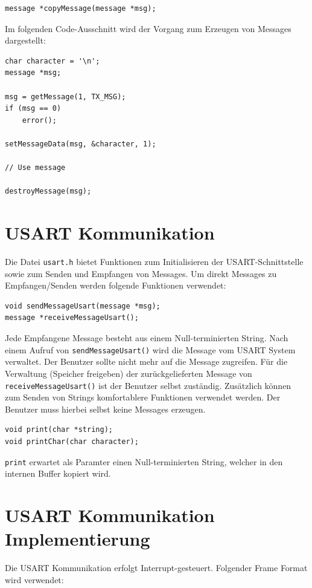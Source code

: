 \documentclass[fontsize=12pt, toc=bibliography, notitlepage]{scrreprt}
\begin{document}
\begin{lstlisting}
message *copyMessage(message *msg);
\end{lstlisting}

Im folgenden Code-Ausschnitt wird der Vorgang zum Erzeugen von Messages dargestellt:

\begin{lstlisting}
char character = '\n';
message *msg;

msg = getMessage(1, TX_MSG);
if (msg == 0)
	error();
	
setMessageData(msg, &character, 1);

// Use message

destroyMessage(msg);
\end{lstlisting}

\section{USART Kommunikation}
\label{subsec:shell-communication}
Die Datei \lstinline$usart.h$ bietet Funktionen zum Initialisieren der USART-Schnittstelle sowie zum Senden und Empfangen von Messages. Um direkt Messages zu Empfangen/Senden werden folgende Funktionen verwendet:

\begin{lstlisting}
void sendMessageUsart(message *msg);
message *receiveMessageUsart();
\end{lstlisting}

Jede Empfangene Message besteht aus einem Null-terminierten String. Nach einem Aufruf von \lstinline$sendMessageUsart()$ wird die Message vom USART System verwaltet. Der Benutzer sollte nicht mehr auf die Message zugreifen. Für die Verwaltung (Speicher freigeben) der zurückgelieferten Message von \lstinline$receiveMessageUsart()$ ist der Benutzer selbst zuständig. Zusätzlich können zum Senden von Strings komfortablere Funktionen verwendet werden. Der Benutzer muss hierbei selbst keine Messages erzeugen.

\begin{lstlisting}
void print(char *string);
void printChar(char character);
\end{lstlisting}

\lstinline$print$ erwartet als Paramter einen Null-terminierten String, welcher in den internen Buffer kopiert wird.

\section{USART Kommunikation Implementierung}
\label{subsec:shell-communication-impl}
Die USART Kommunikation erfolgt Interrupt-gesteuert. Folgender Frame Format wird verwendet:
\end{document}
